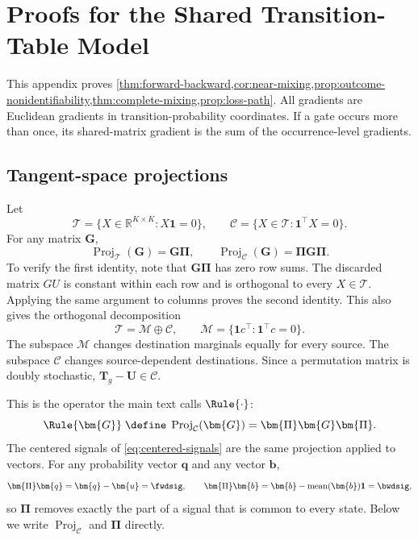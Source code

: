 
\section{Proofs for the Shared Transition-Table Model}
\label{app:operator-proofs}

This appendix proves \cref{thm:forward-backward,cor:near-mixing,prop:outcome-nonidentifiability,thm:complete-mixing,prop:loss-path}. All
gradients are Euclidean gradients in transition-probability coordinates. If a
gate occurs more than once, its shared-matrix gradient is the sum of the
occurrence-level gradients.

\subsection{Tangent-space projections}
\label{app:tangent-projections}

Let
\[
 \mathcal T=\{X\in\mathbb R^{K\times K}:X\mathbf1=0\},\qquad
 \mathcal C=\{X\in\mathcal T:\mathbf1^\top X=0\}.
\]
For any matrix \(\bm{G}\),
\begin{equation}
 \operatorname{Proj}_{\mathcal T}(\bm{G})=\bm{G}\bm{\Pi},\qquad
 \operatorname{Proj}_{\mathcal C}(\bm{G})=\bm{\Pi} \bm{G}\bm{\Pi}.
 \label{eq:tangent-projections}
\end{equation}
To verify the first identity, note that \(\bm{G}\bm{\Pi}\) has zero row sums. The
discarded matrix \(GU\) is constant within each row and is orthogonal to every
\(X\in\mathcal T\). Applying the same argument to columns proves the second
identity. This also gives the orthogonal decomposition
\[
 \mathcal T=\mathcal M\oplus\mathcal C,\qquad
 \mathcal M=\{\mathbf1c^\top:\mathbf1^\top c=0\}.
\]
The subspace \(\mathcal M\) changes destination marginals equally for every
source. The subspace \(\mathcal C\) changes source-dependent destinations.
Since a permutation matrix is doubly stochastic, \(\bm{T}_g-\bm{U}\in\mathcal C\).

This is the operator the main text calls \(\Rule{\cdot}\):
\begin{equation}
 \Rule{\bm{G}}\;\define\;\operatorname{Proj}_{\mathcal C}(\bm{G})=\bm{\Pi} \bm{G}\bm{\Pi} .
 \label{eq:rule-operator}
\end{equation}
The centered signals of \cref{eq:centered-signals} are the same projection
applied to vectors. For any probability vector \(\bm{q}\) and any vector \(\bm{b}\),
\[
 \bm{\Pi} \bm{q}=\bm{q}-\bm{u}=\fwdsig,
 \qquad
 \bm{\Pi} \bm{b}=\bm{b}-\operatorname{mean}(\bm{b})\mathbf1=\bwdsig ,
\]
so \(\bm{\Pi}\) removes exactly the part of a signal that is common to every state.
Below we write \(\operatorname{Proj}_{\mathcal C}\) and \(\bm{\Pi}\) directly.

